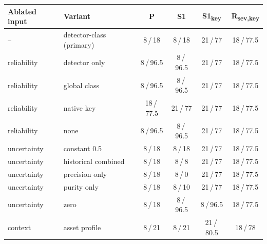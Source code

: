 \begin{tabular}{llcccc}
\toprule
Ablated input & Variant & P & S1 & S1\textsubscript{key} & R\textsubscript{sev,key} \\
\midrule
-- & detector-class (primary) & 8\,/\,18 & 8\,/\,18 & 21\,/\,77 & 18\,/\,77.5 \\
reliability & detector only & 8\,/\,96.5 & 8\,/\,96.5 & 21\,/\,77 & 18\,/\,77.5 \\
reliability & global class & 8\,/\,96.5 & 8\,/\,96.5 & 21\,/\,77 & 18\,/\,77.5 \\
reliability & native key & 18\,/\,77.5 & 21\,/\,77 & 21\,/\,77 & 18\,/\,77.5 \\
reliability & none & 8\,/\,96.5 & 8\,/\,96.5 & 21\,/\,77 & 18\,/\,77.5 \\
uncertainty & constant 0.5 & 8\,/\,18 & 8\,/\,18 & 21\,/\,77 & 18\,/\,77.5 \\
uncertainty & historical combined & 8\,/\,18 & 8\,/\,8 & 21\,/\,77 & 18\,/\,77.5 \\
uncertainty & precision only & 8\,/\,18 & 8\,/\,0 & 21\,/\,77 & 18\,/\,77.5 \\
uncertainty & purity only & 8\,/\,18 & 8\,/\,10 & 21\,/\,77 & 18\,/\,77.5 \\
uncertainty & zero & 8\,/\,18 & 8\,/\,96.5 & 8\,/\,96.5 & 18\,/\,77.5 \\
context & asset profile & 8\,/\,21 & 8\,/\,21 & 21\,/\,80.5 & 18\,/\,78 \\
\bottomrule
\end{tabular}
